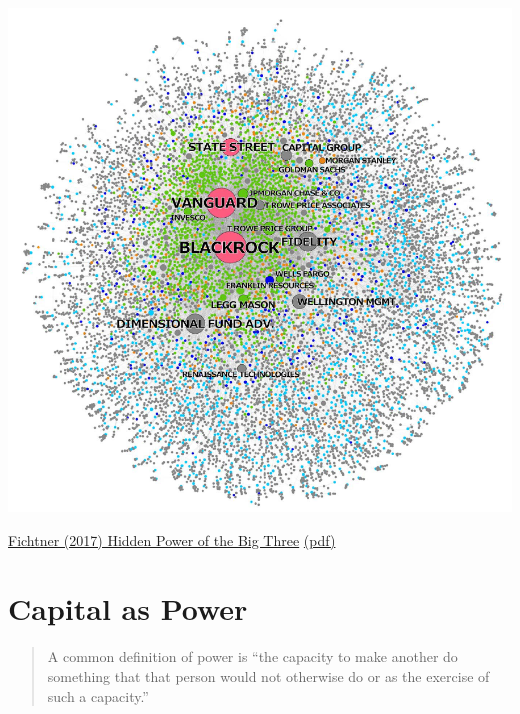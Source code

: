 \documentclass[
]{book}
\begin{document}
\includegraphics{fig/Fichtner_Hidden_Power_of_Big_Tree.png}

\href{https://www.cambridge.org/core/journals/business-and-politics/article/hidden-power-of-the-big-three-passive-index-funds-reconcentration-of-corporate-ownership-and-new-financial-risk/30AD689509AAD62F5B677E916C28C4B6}{Fichtner (2017) Hidden Power of the Big Three}
\href{pdf/Fichtner_2017_Hidden_Power_Big3.pdf}{(pdf)}

\hypertarget{capital-as-power}{%
\chapter{Capital as Power}\label{capital-as-power}}

\begin{quote}
A common definition of power is ``the capacity to make another do something that that person would not otherwise do or as the exercise of such a capacity.''
\end{quote}
\end{document}
